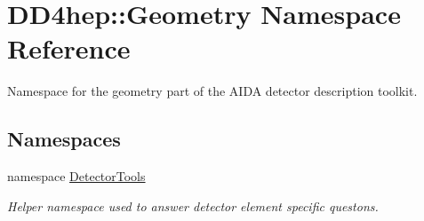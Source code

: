 \hypertarget{namespace_d_d4hep_1_1_geometry}{
\section{DD4hep::Geometry Namespace Reference}
\label{namespace_d_d4hep_1_1_geometry}
}


Namespace for the geometry part of the AIDA detector description toolkit.  
\subsection*{Namespaces}
\begin{DoxyCompactItemize}
\item 
namespace \hyperlink{namespace_d_d4hep_1_1_geometry_1_1_detector_tools}{DetectorTools}


\begin{DoxyCompactList}\small\item\em Helper namespace used to answer detector element specific questons. \item\end{DoxyCompactList}\end{DoxyCompactItemize}
